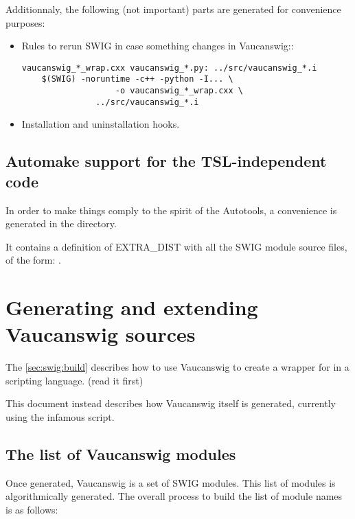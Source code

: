 Additionnaly, the following (not important) parts are generated for
convenience purposes:

\begin{itemize}
\item Rules to rerun SWIG in case something changes in Vaucanswig::
\begin{lstlisting}[language=Make]
vaucanswig_*_wrap.cxx vaucanswig_*.py: ../src/vaucanswig_*.i
	$(SWIG) -noruntime -c++ -python -I... \
	               -o vaucanswig_*_wrap.cxx \
		       ../src/vaucanswig_*.i
\end{lstlisting}%

\item Installation and uninstallation hooks.
\end{itemize}


\subsection{Automake support for the TSL-independent code}

In order to make things comply to the spirit of the Autotools, a
convenience  is generated in the 
directory.

It contains a definition of EXTRA\_DIST with all the SWIG module
source files, of the form: .


\section{Generating and extending Vaucanswig sources}
\label{sec:swig:meta}

The \autoref{sec:swig:build} describes how to use Vaucanswig to create
a wrapper for \Vauc in a scripting language.  (read it first)

This document instead describes how Vaucanswig itself is generated,
currently using the infamous  script.

\subsection{The list of Vaucanswig modules}

Once generated, Vaucanswig is a set of SWIG modules. This list of
modules is algorithmically generated. The overall process to build the
list of module names is as follows:

